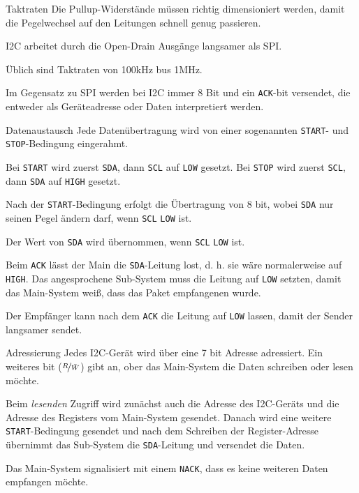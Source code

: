 \begin{bonus}{Taktraten}
    Die Pullup-Widerstände müssen richtig dimensioniert werden, damit die Pegelwechsel auf den Leitungen schnell genug passieren.

    I2C arbeitet durch die Open-Drain Ausgänge langsamer als SPI.

    Üblich sind Taktraten von 100kHz bus 1MHz.

    Im Gegensatz zu SPI werden bei I2C immer 8 Bit und ein \texttt{ACK}-bit versendet, die entweder als Geräteadresse oder Daten interpretiert werden.
\end{bonus}

\begin{defi}{Datenaustausch}
    Jede Datenübertragung wird von einer sogenannten \texttt{START}- und \texttt{STOP}-Bedingung eingerahmt.

    Bei \texttt{START} wird zuerst \texttt{SDA}, dann \texttt{SCL} auf \texttt{LOW} gesetzt.
    Bei \texttt{STOP} wird zuerst \texttt{SCL}, dann \texttt{SDA} auf \texttt{HIGH} gesetzt.

    Nach der \texttt{START}-Bedingung erfolgt die Übertragung von 8 bit, wobei \texttt{SDA} nur seinen Pegel ändern darf, wenn \texttt{SCL} \texttt{LOW} ist.

    Der Wert von \texttt{SDA} wird übernommen, wenn \texttt{SCL} \texttt{LOW} ist.

    Beim \texttt{ACK} lässt der Main die \texttt{SDA}-Leitung lost, d. h. sie wäre normalerweise auf \texttt{HIGH}.
    Das angesprochene Sub-System muss die Leitung auf \texttt{LOW} setzten, damit das Main-System weiß, dass das Paket empfangenen wurde.

    Der Empfänger kann nach dem \texttt{ACK} die Leitung auf \texttt{LOW} lassen, damit der Sender langsamer sendet.
\end{defi}

\begin{defi}{Adressierung}
    Jedes I2C-Gerät wird über eine 7 bit Adresse adressiert.
    Ein weiteres bit ($\nicefrac{R}{\bar{W}}$) gibt an, ober das Main-System die Daten schreiben oder lesen möchte.

    Beim \emph{lesenden} Zugriff wird zunächst auch die Adresse des I2C-Geräts und die Adresse des Registers vom Main-System gesendet.
    Danach wird eine weitere \texttt{START}-Bedingung gesendet und nach dem Schreiben der Register-Adresse übernimmt das Sub-System die \texttt{SDA}-Leitung und versendet die Daten.

    Das Main-System signalisiert mit einem \texttt{NACK}, dass es keine weiteren Daten empfangen möchte.
\end{defi}


